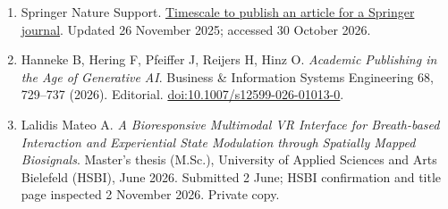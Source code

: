 \begin{enumerate}
\item Springer Nature Support. \href{https://support.springernature.com/en/support/solutions/articles/6000131708-timescale-to-publish-an-article-for-a-springer-journal}{Timescale to publish an article for a Springer journal}. Updated 26 November 2025; accessed 30 October 2026.
\item Hanneke B, Hering F, Pfeiffer J, Reijers H, Hinz O. \emph{Academic Publishing in the Age of Generative AI}. Business \& Information Systems Engineering 68, 729--737 (2026). Editorial. \href{https://doi.org/10.1007/s12599-026-01013-0}{doi:10.1007/s12599-026-01013-0}.
\item Lalidis Mateo A. \emph{A Bioresponsive Multimodal VR Interface for Breath-based Interaction and Experiential State Modulation through Spatially Mapped Biosignals}. Master's thesis (M.Sc.), University of Applied Sciences and Arts Bielefeld (HSBI), June 2026. Submitted 2 June; HSBI confirmation and title page inspected 2 November 2026. Private copy.
\end{enumerate}
\normalsize
